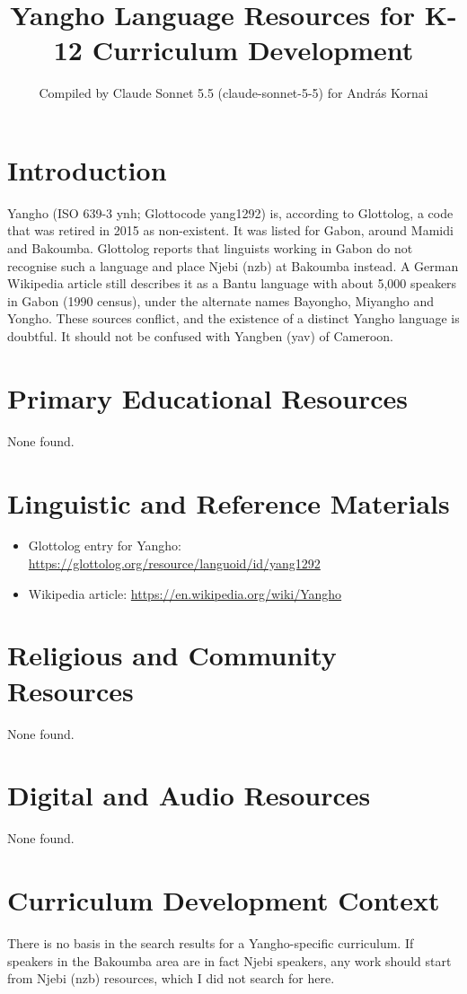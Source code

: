 \documentclass[12pt]{article}
\title{Yangho Language Resources for K-12 Curriculum Development}
\author{Compiled by Claude Sonnet 5.5 (claude-sonnet-5-5) for Andr\'as Kornai}
\date{}
\begin{document}
\maketitle

\section{Introduction}
Yangho (ISO 639-3 ynh; Glottocode yang1292) is, according to Glottolog, a code that was retired in 2015 as non-existent. It was listed for Gabon, around Mamidi and Bakoumba. Glottolog reports that linguists working in Gabon do not recognise such a language and place Njebi (nzb) at Bakoumba instead. A German Wikipedia article still describes it as a Bantu language with about 5,000 speakers in Gabon (1990 census), under the alternate names Bayongho, Miyangho and Yongho. These sources conflict, and the existence of a distinct Yangho language is doubtful. It should not be confused with Yangben (yav) of Cameroon.

\section{Primary Educational Resources}
None found.

\section{Linguistic and Reference Materials}
\begin{itemize}
\item Glottolog entry for Yangho: \url{https://glottolog.org/resource/languoid/id/yang1292}
\item Wikipedia article: \url{https://en.wikipedia.org/wiki/Yangho}
\end{itemize}

\section{Religious and Community Resources}
None found.

\section{Digital and Audio Resources}
None found.

\section{Curriculum Development Context}
There is no basis in the search results for a Yangho-specific curriculum. If speakers in the Bakoumba area are in fact Njebi speakers, any work should start from Njebi (nzb) resources, which I did not search for here.
\end{document}
